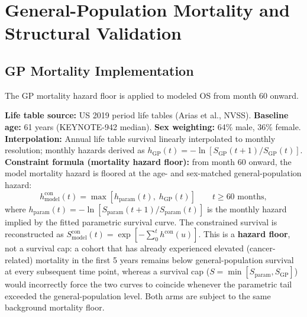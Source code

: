 \documentclass[11pt,a4paper]{article}
\begin{document}
\section{General-Population Mortality and Structural Validation}

\subsection{GP Mortality Implementation}
\label{sec:gp_impl}
The GP mortality hazard floor is applied to modeled OS from month 60 onward.

\textbf{Life table source:} US 2019 period life tables (Arias et al., NVSS).
\textbf{Baseline age:} 61 years (\mbox{KEYNOTE-942} median). \textbf{Sex weighting:} 64\% male, 36\% female.
\textbf{Interpolation:} Annual life table survival linearly interpolated to monthly resolution; monthly hazards derived as $h_{\text{GP}}(t) = -\ln[S_{\text{GP}}(t{+}1)/S_{\text{GP}}(t)]$.
\textbf{Constraint formula (mortality hazard floor):} from month 60 onward, the model mortality hazard is floored at the age- and sex-matched general-population hazard:
\begin{equation}
    h_{\text{model}}^{\text{con}}(t) = \max\left[h_{\text{param}}(t),\; h_{\text{GP}}(t)\right] \qquad t \geq 60 \text{ months},
\end{equation}
where $h_{\text{param}}(t) = -\ln[S_{\text{param}}(t{+}1)/S_{\text{param}}(t)]$ is the monthly hazard implied by the fitted parametric survival curve. The constrained survival is reconstructed as $S_{\text{model}}^{\text{con}}(t) = \exp[-\sum_{0}^{t} h^{\text{con}}(u)]$. This is a \textbf{hazard floor}, not a survival cap: a cohort that has already experienced elevated (cancer-related) mortality in the first 5 years remains below general-population survival at every subsequent time point, whereas a survival cap ($S = \min[S_{\text{param}}, S_{\text{GP}}]$) would incorrectly force the two curves to coincide whenever the parametric tail exceeded the general-population level. Both arms are subject to the same background mortality floor.
\end{document}
